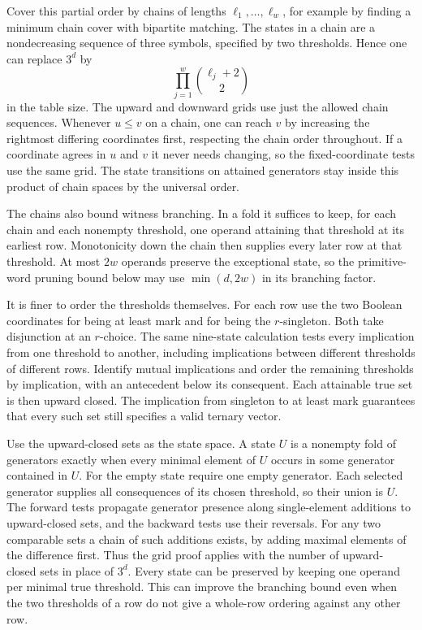 Cover this partial order by chains of lengths
$\ell_1,\ldots,\ell_w$, for example by finding a
minimum chain cover with bipartite matching. The
states in a chain are a nondecreasing sequence of
three symbols, specified by two thresholds. Hence
one can replace $3^d$ by
\[
                         \prod_{j=1}^w\binom{\ell_j+2}{2}
\]
in the table size. The upward and downward grids
use just the allowed chain sequences. Whenever
$u\le v$ on a chain, one can reach $v$ by increasing
the rightmost differing coordinates first, respecting
the chain order throughout. If a coordinate agrees
in $u$ and $v$ it never needs changing, so the
fixed-coordinate tests use the same grid. The
state transitions on attained generators stay inside
this product of chain spaces by the universal order.

The chains also bound witness branching. In a fold
it suffices to keep, for each chain and each
nonempty threshold, one operand attaining that
threshold at its earliest row. Monotonicity down
the chain then supplies every later row at that
threshold. At most $2w$ operands preserve the
exceptional state, so the primitive-word pruning
bound below may use $\min(d,2w)$ in its branching
factor.

It is finer to order the thresholds themselves. For
each row use the two Boolean coordinates for being
at least mark and for being the $r$-singleton.
Both take disjunction at an $r$-choice. The same
nine-state calculation tests every implication from
one threshold to another, including implications
between different thresholds of different rows.
Identify mutual implications and order the remaining
thresholds by implication, with an antecedent below
its consequent. Each attainable true set is then
upward closed. The implication from singleton to
at least mark guarantees that every such set still
specifies a valid ternary vector.

Use the upward-closed sets as the state space. A state
$U$ is a nonempty fold of generators exactly when
every minimal element of $U$ occurs in some generator
contained in $U$. For the empty state require one
empty generator. Each selected generator supplies all
consequences of its chosen threshold, so their union
is $U$. The forward tests propagate generator presence
along single-element additions to upward-closed sets,
and the backward tests use their reversals. For any
two comparable sets a chain of such additions exists,
by adding maximal elements of the difference first.
Thus the grid proof applies with the number of upward-
closed sets in place of $3^d$. Every state can be
preserved by keeping one operand per minimal true
threshold. This can improve the branching bound even
when the two thresholds of a row do not give a
whole-row ordering against any other row.


